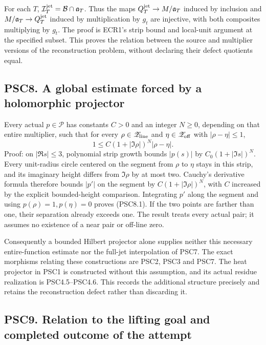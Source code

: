 For each \(T\), \(\mathcal I_T^{\rm jet}=\mathcal B\cap\mathfrak a_T\).
Thus the maps \(Q_T^{\rm jet}\to M/\mathfrak a_T\) induced by inclusion
and \(M/\mathfrak a_T\to Q_T^{\rm jet}\) induced by multiplication by
\(g_t\) are injective, with both composites multiplying by \(g_t\). The
proof is ECR1's strip bound and local-unit argument at the specified
subset. This proves the relation between the source and multiplier
versions of the reconstruction problem, without declaring their defect
quotients equal.

\subsection{PSC8. A global estimate forced by a holomorphic
projector}\label{psc8.-a-global-estimate-forced-by-a-holomorphic-projector}

Every actual \(p\in\mathscr P\) has constants \(C>0\) and an integer
\(N\ge0\), depending on that entire multiplier, such that for every
\(\rho\in\mathscr Z_{\rm line}\) and \(\eta\in\mathscr Z_{\rm off}\)
with \(|\rho-\eta|\le1\), \[
1\le C(1+|\Im\rho|)^N|\rho-\eta|.
\tag{PSC8.1}
\] Proof: on \(|\Re s|\le3\), polynomial strip growth bounds \(|p(s)|\)
by \(C_0(1+|\Im s|)^N\). Every unit-radius circle centered on the
segment from \(\rho\) to \(\eta\) stays in this strip, and its imaginary
height differs from \(\Im\rho\) by at most two. Cauchy's derivative
formula therefore bounds \(|p'|\) on the segment by
\(C(1+|\Im\rho|)^N\), with \(C\) increased by the explicit
bounded-height comparison. Integrating \(p'\) along the segment and
using \(p(\rho)=1,p(\eta)=0\) proves (PSC8.1). If the two points are
farther than one, their separation already exceeds one. The result
treats every actual pair; it assumes no existence of a near pair or
off-line zero.

Consequently a bounded Hilbert projector alone supplies neither this
necessary entire-function estimate nor the full-jet interpolation of
PSC7. The exact morphisms relating these constructions are PSC2, PSC3
and PSC7. The heat projector in PSC1 is constructed without this
assumption, and its actual residue realization is PSC4.5--PSC4.6. This
records the additional structure precisely and retains the
reconstruction defect rather than discarding it.

\subsection{PSC9. Relation to the lifting goal and completed outcome of
the
attempt}\label{psc9.-relation-to-the-lifting-goal-and-completed-outcome-of-the-attempt}

